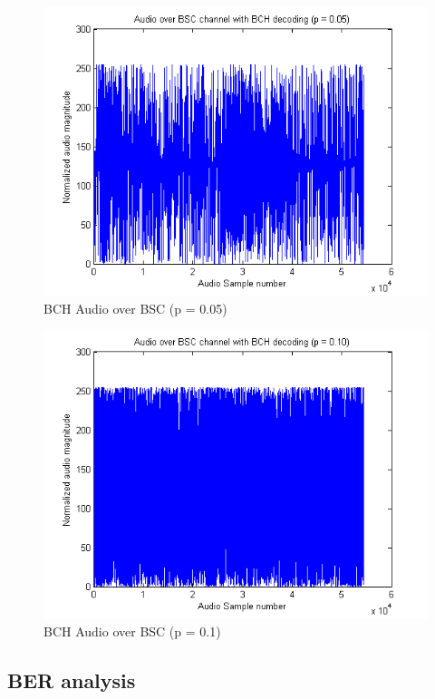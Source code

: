 \documentclass[a4paper]{article}
\begin{document}
\begin{figure}[H]
\centering
\includegraphics[scale=0.5]{plots/audio_over_bsc_bch_p_005.png}
\caption{BCH Audio over BSC (p = 0.05)}
\end{figure}

\begin{figure}[H]
\centering
\includegraphics[scale=0.5]{plots/audio_over_bsc_bch_p_010.png}
\caption{BCH Audio over BSC (p = 0.1)}
\end{figure}

\subsection{BER analysis}
\end{document}
